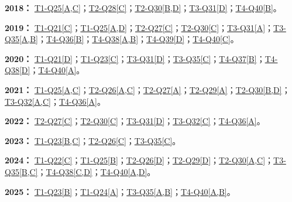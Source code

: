 \documentclass[11pt,a4paper]{article}
\begin{document}
\noindent\textbf{2018：} \hyperref[idx-2018-T1-Q25]{T1-Q25[A,C]}；\hyperref[idx-2018-T2-Q28]{T2-Q28[C]}；\hyperref[idx-2018-T2-Q30]{T2-Q30[B,D]}；\hyperref[idx-2018-T3-Q31]{T3-Q31[D]}；\hyperref[idx-2018-T4-Q40]{T4-Q40[B]}。\par\smallskip
\noindent\textbf{2019：} \hyperref[idx-2019-T1-Q21]{T1-Q21[C]}；\hyperref[idx-2019-T1-Q25]{T1-Q25[A,D]}；\hyperref[idx-2019-T2-Q27]{T2-Q27[C]}；\hyperref[idx-2019-T2-Q30]{T2-Q30[C]}；\hyperref[idx-2019-T3-Q31]{T3-Q31[A]}；\hyperref[idx-2019-T3-Q35]{T3-Q35[A,B]}；\hyperref[idx-2019-T4-Q36]{T4-Q36[B]}；\hyperref[idx-2019-T4-Q38]{T4-Q38[A,B]}；\hyperref[idx-2019-T4-Q39]{T4-Q39[D]}；\hyperref[idx-2019-T4-Q40]{T4-Q40[C]}。\par\smallskip
\noindent\textbf{2020：} \hyperref[idx-2020-T1-Q21]{T1-Q21[D]}；\hyperref[idx-2020-T1-Q23]{T1-Q23[C]}；\hyperref[idx-2020-T3-Q31]{T3-Q31[D]}；\hyperref[idx-2020-T3-Q35]{T3-Q35[C]}；\hyperref[idx-2020-T4-Q37]{T4-Q37[B]}；\hyperref[idx-2020-T4-Q38]{T4-Q38[D]}；\hyperref[idx-2020-T4-Q40]{T4-Q40[A]}。\par\smallskip
\noindent\textbf{2021：} \hyperref[idx-2021-T1-Q25]{T1-Q25[A,C]}；\hyperref[idx-2021-T2-Q26]{T2-Q26[A,C]}；\hyperref[idx-2021-T2-Q27]{T2-Q27[A]}；\hyperref[idx-2021-T2-Q29]{T2-Q29[A]}；\hyperref[idx-2021-T2-Q30]{T2-Q30[B,D]}；\hyperref[idx-2021-T3-Q32]{T3-Q32[A,C]}；\hyperref[idx-2021-T4-Q36]{T4-Q36[A]}。\par\smallskip
\noindent\textbf{2022：} \hyperref[idx-2022-T2-Q27]{T2-Q27[C]}；\hyperref[idx-2022-T2-Q30]{T2-Q30[C]}；\hyperref[idx-2022-T3-Q31]{T3-Q31[D]}；\hyperref[idx-2022-T3-Q32]{T3-Q32[C]}；\hyperref[idx-2022-T4-Q36]{T4-Q36[A]}。\par\smallskip
\noindent\textbf{2023：} \hyperref[idx-2023-T1-Q23]{T1-Q23[B,C]}；\hyperref[idx-2023-T2-Q26]{T2-Q26[C]}；\hyperref[idx-2023-T3-Q35]{T3-Q35[C]}。\par\smallskip
\noindent\textbf{2024：} \hyperref[idx-2024-T1-Q22]{T1-Q22[C]}；\hyperref[idx-2024-T1-Q25]{T1-Q25[B]}；\hyperref[idx-2024-T2-Q26]{T2-Q26[D]}；\hyperref[idx-2024-T2-Q29]{T2-Q29[D]}；\hyperref[idx-2024-T2-Q30]{T2-Q30[A,C]}；\hyperref[idx-2024-T3-Q35]{T3-Q35[B,C]}；\hyperref[idx-2024-T4-Q38]{T4-Q38[C,D]}；\hyperref[idx-2024-T4-Q40]{T4-Q40[A,D]}。\par\smallskip
\noindent\textbf{2025：} \hyperref[idx-2025-T1-Q23]{T1-Q23[B]}；\hyperref[idx-2025-T1-Q24]{T1-Q24[A]}；\hyperref[idx-2025-T3-Q35]{T3-Q35[A,B]}；\hyperref[idx-2025-T4-Q40]{T4-Q40[A,B]}。\par\smallskip
{}
\end{document}
